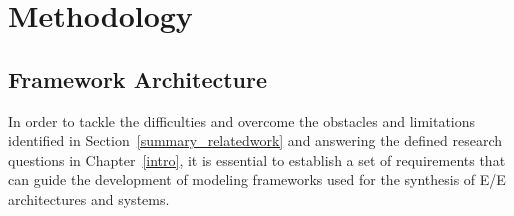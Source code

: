 \chapter{Methodology}%
\label{method}


\section{Framework Architecture}



    In order to tackle the difficulties and overcome the obstacles and limitations identified in Section~\ref{summary_relatedwork} and answering the defined research questions in Chapter~\ref{intro}, it is essential to establish a set of requirements that can guide the development of modeling frameworks used for the synthesis of E/E architectures and systems.

